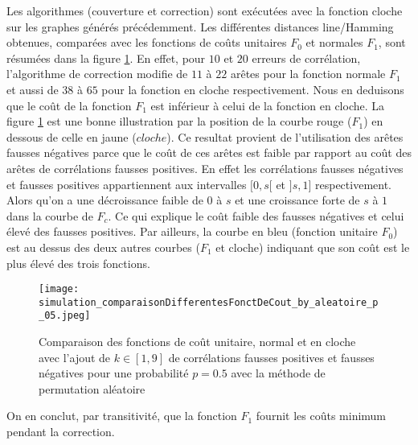 Les algorithmes (couverture et correction) sont ex\'ecut\'ees avec la fonction cloche sur les graphes g\'en\'er\'es pr\'ec\'edemment. 
Les diff\'erentes distances line/Hamming obtenues, compar\'ees avec les fonctions de co\^uts unitaires $F_0$ et normales $F_1$, sont r\'esum\'ees dans la figure \ref{comparaison_fct_cloche_unitaire_normal_p05}.
En effet, pour $10$ et $20$ erreurs de corr\'elation, l'algorithme de correction modifie  de $11$ \`a $22$ ar\^etes pour la fonction normale $F_1$ et aussi de $38$ \`a $65$ pour la fonction en cloche respectivement. 
Nous en deduisons que le co\^ut de la fonction $F_1$ est  inf\'erieur \`a celui de la fonction en cloche. 
La figure \ref{comparaison_fct_cloche_unitaire_normal_p05}  est une bonne illustration par la position de la courbe rouge ($F_1$) en dessous de celle en jaune ($cloche$).
\newline
Ce resultat provient de l'utilisation des ar\^etes fausses n\'egatives parce que le co\^ut de ces ar\^etes est faible par rapport au co\^ut des ar\^etes de corr\'elations fausses positives.
En effet les corr\'elations fausses n\'egatives et fausses positives appartiennent aux intervalles $[0,s[$ et $]s,1]$ respectivement. 
Alors qu'on a une d\'ecroissance faible de $0$ \`a $s$ et une croissance forte de $s$ \`a $1$ dans la courbe de $F_c$. 
Ce qui explique le co\^ut faible des fausses n\'egatives et celui \'elev\'e des fausses positives. 
Par ailleurs, la courbe en bleu (fonction unitaire $F_0$) est au dessus des deux autres courbes ($F_1$ et cloche) indiquant que son co\^ut est le plus \'elev\'e des trois fonctions.
\newline
\begin{figure}[htb!] 
\centering
\texttt{[image: simulation\_comparaisonDifferentesFonctDeCout\_by\_aleatoire\_p\_05.jpeg]}
\caption{ Comparaison des fonctions de co\^ut unitaire, normal et en cloche avec l'ajout de $k \in [1,9]$ de corr\'elations fausses positives et fausses n\'egatives pour une probabilit\'e $p = 0.5$ avec la m\'ethode de permutation al\'eatoire }
\label{comparaison_fct_cloche_unitaire_normal_p05} 
\end{figure}
On en conclut, par transitivit\'e, que la fonction $F_1$ fournit les co\^uts minimum pendant la correction.


